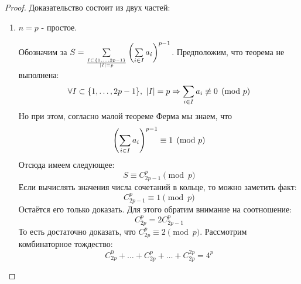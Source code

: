 \begin{proof}
	Доказательство состоит из двух частей:
	\begin{enumerate}
		\item $n = p$ - простое.
		
		Обозначим за $S = \sum\limits_{I \subset \{1, \ldots, 2p - 1\} \over |I| = p} \left(\sum\limits_{i \in I} a_i\right)^{p - 1}$. Предположим, что теорема не выполнена:
		\[
			\forall I \subset \{1, \ldots, 2p - 1\},\ |I| = p \Rightarrow \sum\limits_{i \in I} a_i \not\equiv 0 \pmod p
		\]
		Но при этом, согласно малой теореме Ферма мы знаем, что
		\[
			\left(\sum\limits_{i \in I} a_i\right)^{p - 1} \equiv 1 \pmod p
		\]
		Отсюда имеем следующее:
		\[
			S \equiv C_{2p - 1}^p \pmod p
		\]
		Если вычислять значения числа сочетаний в кольце, то можно заметить факт:
		\[
			C_{2p - 1}^p \equiv 1 \pmod p
		\]
		Остаётся его только доказать. Для этого обратим внимание на соотношение:
		\[
			C_{2p}^p = 2C_{2p - 1}^p
		\]
		То есть достаточно доказать, что $C_{2p}^p \equiv 2 \pmod p$. Рассмотрим комбинаторное тождество:
		\[
			C_{2p}^0 + \ldots + C_{2p}^p + \ldots + C_{2p}^{2p} = 4^p
		\]
		

\end{enumerate}
\end{proof}
